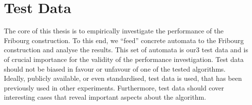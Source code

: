 



\section{Test Data}
The core of this thesis is to empirically investigate the performance of the Fribourg construction. To this end, we ``feed'' concrete automata to the Fribourg construction and analyse the results. This set of automata is our3 test data and is of crucial importance for the validity of the performance investigation. Test data should not be biased in favour or unfavour of one of the tested algorithms. Ideally, publicly available, or even standardised, test data is used, that has been previously used in other experiments. Furthermore, test data should cover interesting cases that reveal important aspects about the algorithm.

